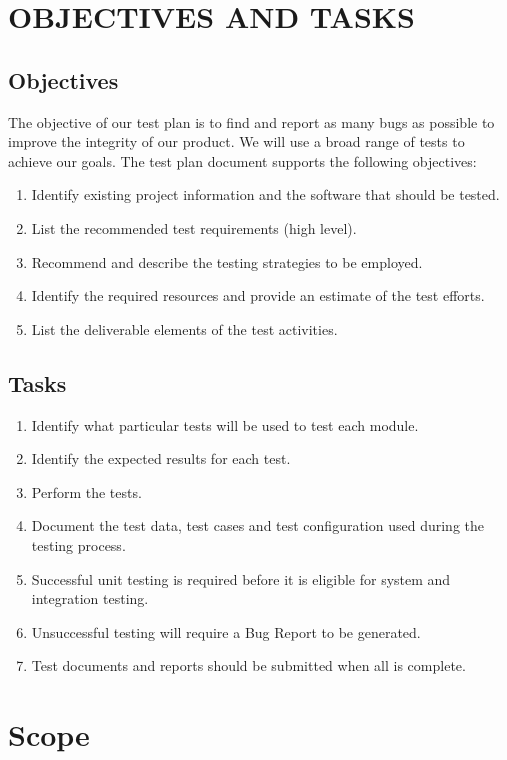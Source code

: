 \documentclass{article}
\begin{document}
\newpage

\section{OBJECTIVES AND TASKS}

\subsection{Objectives}
The objective of our test plan is to find and report as many bugs as possible to improve the integrity of our product. We will use a broad range of tests to achieve our goals. The test plan document supports the following objectives:
\begin{enumerate}
    \item Identify existing project information and the software that            should be tested.
    \item List the recommended test requirements (high level).
    \item Recommend and describe the testing strategies to be employed.
    \item Identify the required resources and provide an estimate of the         test efforts.
    \item List the deliverable elements of the test activities.
\end{enumerate}
\subsection{Tasks}
\begin{enumerate}
    \item Identify what particular tests will be used to test each module.
    \item Identify the expected results for each test.
    \item Perform the tests.    
    \item Document the test data, test cases and test configuration used during the testing process.
    \item Successful unit testing is required before it is eligible for system and integration testing.
    \item Unsuccessful testing will require a Bug Report to be generated.
    \item Test documents and reports should be submitted when all is complete.
\end{enumerate}

\newpage

\section{Scope}
\end{document}
